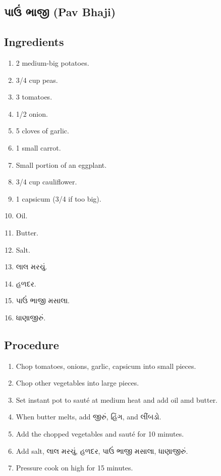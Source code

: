 \documentclass[../../recipes.tex]{subfiles}
\begin{document}
\begin{gujarati}

\chapter{પાઉં ભાજી (Pav Bhaji)}

\section*{Ingredients}

\begin{enumerate}
    \item 2 medium-big potatoes.
    \item 3/4 cup peas.
    \item 3 tomatoes.
    \item 1/2 onion.
    \item 5 cloves of garlic.
    \item 1 small carrot.
    \item Small portion of an eggplant.
    \item 3/4 cup cauliflower.
    \item 1 capsicum (3/4 if too big).
    \item Oil.
    \item Butter.
    \item Salt.
    \item લાલ મરચું.
    \item હળદર.
    \item પાઉં ભાજી મસાલા.
    \item ધાણાજીરું.
\end{enumerate}

\noindent
\section*{Procedure}

\begin{enumerate}
    \item Chop tomatoes, onions, garlic, capsicum into small pieces.
    \item Chop other vegetables into large pieces.
    \item Set instant pot to sauté at medium heat and add oil amd butter.
    \item When butter melts, add જીરું, હિંગ, and લીંબડો.
    \item Add the chopped vegetables and sauté for 10 minutes.
    \item Add salt,  લાલ મરચું, હળદર, પાઉં ભાજી મસાલા, ધાણાજીરું.
    \item Pressure cook on high for 15 minutes.
\end{enumerate}

\end{gujarati}
\end{document}
